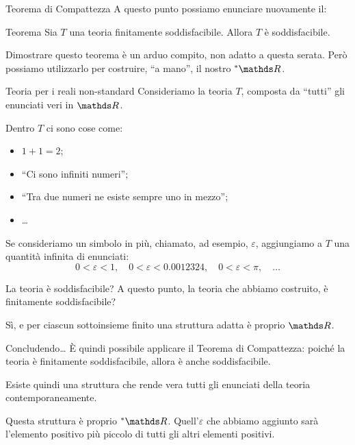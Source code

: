 \documentclass[babel]{beamer}
\begin{document}
\begin{frame}[label={sec:org73b7e3e}]{Teorema di Compattezza}
A questo punto possiamo enunciare nuovamente il:
\begin{block}{Teorema}
Sia \(T\) una teoria finitamente soddisfacibile. Allora \(T\) è soddisfacibile.
\end{block}
Dimostrare questo teorema è un arduo compito, non adatto a questa serata. Però possiamo \alert{utilizzarlo} per costruire, ``a mano'', il nostro \(\null^{*} \R\).
\end{frame}
\begin{frame}[label={sec:org84c2832}]{Teoria per i reali non-standard}
Consideriamo la teoria \(T\), composta da ``tutti'' gli \alert{enunciati veri in \(\R\)}.

Dentro \(T\) ci sono cose come:
\begin{itemize}
\item \(1+1=2\);
\item ``Ci sono infiniti numeri'';
\item ``Tra due numeri ne esiste sempre uno in mezzo'';
\item \ldots{}
\end{itemize}

Se consideriamo un simbolo in più, chiamato, ad esempio, \(\varepsilon\), aggiungiamo a \(T\) una quantità infinita di enunciati:
\begin{equation*}
0 < \varepsilon < 1, \quad 0 < \varepsilon < 0.0012324, \quad 0 < \varepsilon < \pi, \quad \dots
\end{equation*}
\end{frame}
\begin{frame}[label={sec:org989b470}]{La teoria è soddisfacibile?}
A questo punto, la teoria che abbiamo costruito, è finitamente soddisfacibile?

\alert{Sì}, e per ciascun sottoinsieme finito una struttura adatta è proprio \(\R\).
\end{frame}
\begin{frame}[label={sec:orgc7ddf91}]{Concludendo\ldots{}}
È quindi possibile applicare il \alert{Teorema di Compattezza}: poiché la teoria è finitamente soddisfacibile, allora è anche \alert{soddisfacibile}.

Esiste quindi una struttura che rende vera \alert{tutti gli enunciati della teoria contemporaneamente}.

Questa struttura è proprio \(\null^{*} \R\). Quell'\(\varepsilon\) che abbiamo aggiunto sarà l'elemento positivo più piccolo di \alert{tutti gli altri elementi positivi}.
\end{frame}
\end{document}
